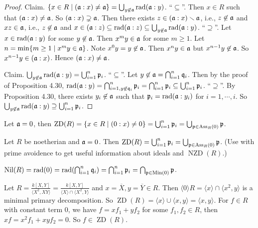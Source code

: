 \begin{proof}
    Claim. $\{x \in R \mid (\mathfrak{a}:x) \neq \mathfrak{a}\} = \bigcup_{y \not\in \mathfrak{a}} \operatorname{rad}(\mathfrak{a}:y)$. ``$\subseteq$''. Then $x \in R$ such that $(\mathfrak{a}:x) \neq \mathfrak{a}$. So $(\mathfrak{a}:x) \supsetneq \mathfrak{a}$. Then there exists $z \in (\mathfrak{a}:x) \smallsetminus \mathfrak{a}$, i.e., $z \not \in \mathfrak{a}$ and $xz \in \mathfrak{a}$, i.e., $z \not \in \mathfrak{a}$ and $x \in (\mathfrak{a}:z) \subseteq \operatorname{rad}(\mathfrak{a}:z) \subseteq \bigcup_{y \not\in \mathfrak{a}} \operatorname{rad}(\mathfrak{a}:y)$. ``$\supseteq$''. Let $x \in \operatorname{rad}(\mathfrak{a}:y)$ for some $y \not\in \mathfrak{a}$. Then $x^{m}y \in \mathfrak{a}$ for some $m \geq 1$. Let $n = \min\{m \geq 1 \mid x^{m}y \in \mathfrak{a}\}$. Note $x^{0}y = y \not \in \mathfrak{a}$. Then $x^{n}y \in \mathfrak{a}$ but $x^{n-1}y \not \in \mathfrak{a}$. So $x^{n-1}y \in (\mathfrak{a}:x)$. Hence $(\mathfrak{a}:x) \neq \mathfrak{a}$. \par
    Claim. $\bigcup_{y \not\in \mathfrak{a}} \operatorname{rad}(\mathfrak{a}:y) = \bigcup_{i=1}^{n}\mathfrak{p}_i$. ``$\subseteq$''. Let $y \not\in \mathfrak{a} = \bigcap_{i=1}^{n} \mathfrak{q}_i$. Then by the proof of Proposition 4.30, $\operatorname{rad}(\mathfrak{a}:y) = \bigcap_{i=1,y \not \in \mathfrak{q}_i}^{n} \mathfrak{p}_i = \bigcap_{i=1}^{n} \mathfrak{p}_i \subseteq \bigcup_{i=1}^{n}\mathfrak{p}_i$. ``$\supseteq$''. By Proposition 4.30, there exists $y_i \not \in \mathfrak{a}$ such that $\mathfrak{p}_i = \operatorname{rad}(\mathfrak{a}:y_i)$ for $i = 1,\cdots,i$. So $\bigcup_{y \not\in \mathfrak{a}} \operatorname{rad}(\mathfrak{a}:y) \supseteq \bigcup_{i=1}^{n} \mathfrak{p}_i$. 
\end{proof}

\begin{corollary}
    Let $\mathfrak{a} = 0$, then $\operatorname{ZD}(R) = \{x \in R \mid (0:x) \neq 0\} = \bigcup_{i=1}^{n} \mathfrak{p}_i = \bigcup_{\mathfrak{p} \in \operatorname{Ass}_R(0)}\mathfrak{p}$.
\end{corollary}

\begin{summary}
    Let $R$ be noetherian and $\mathfrak{a} = 0$. Then $\operatorname{ZD}(R) = \bigcup_{i=1}^{n} \mathfrak{p}_i = \bigcup_{\mathfrak{p} \in \operatorname{Ass}_R(0)}\mathfrak{p}$. (Use with prime avoidence to get useful information about ideals and $\operatorname{NZD}(R)$.) \par 
    $\operatorname{Nil}(R) = \operatorname{rad}(0) = \operatorname{rad}(\bigcap_{i=1}^{n}\mathfrak{q}_i) = \bigcap_{i=1}^{n} \mathfrak{p}_i = \bigcap_{\mathfrak{p} \in \operatorname{Min}(0)} \mathfrak{p}$.
\end{summary}

\begin{example*}
    Let $R = \frac{k[X,Y]}{\langle X^{2},XY \rangle} = \frac{k[X,Y]}{\langle X \rangle \cap \langle X^{2},Y \rangle}$ and $x = \overbar{X}, y= \overbar{Y} \in R$. Then $\langle 0 \rangle R = \langle x \rangle \cap \langle x^{2}, y \rangle$ is a minimal primary decomposition. So $\operatorname{ZD}(R) = \langle x \rangle \cup \langle x, y \rangle = \langle x, y \rangle$. For $f \in R$ with constant term 0, we have $f = xf_1 + yf_2$ for some $f_1,f_2 \in R$, then $xf = x^{2}f_1 + xyf_2 = 0$. So $f \in \operatorname{ZD}(R)$.
\end{example*}

